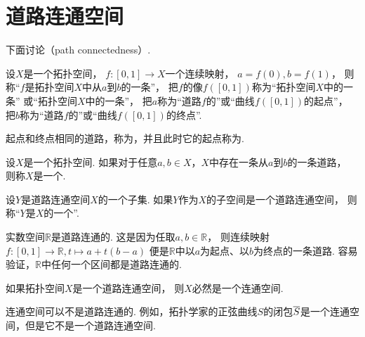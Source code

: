 \section{道路连通空间}
下面讨论（path connectedness）.

\begin{definition}
设\(X\)是一个拓扑空间，
\(f\colon [0,1] \to X\)一个连续映射，
\(a=f(0),
b=f(1)\)，
则称“\(f\)是拓扑空间\(X\)中从\(a\)到\(b\)的一条”，
把\(f\)的像\(f([0,1])\)称为“拓扑空间\(X\)中的一条”
或“拓扑空间\(X\)中的一条”，
把\(a\)称为“道路\(f\)的”或“曲线\(f([0,1])\)的{起点}”，
把\(b\)称为“道路\(f\)的”或“曲线\(f([0,1])\)的{终点}”.
\end{definition}

\begin{definition}
起点和终点相同的道路，称为，并且此时它的起点称为.
\end{definition}

\begin{definition}
设\(X\)是一个拓扑空间.
如果对于任意\(a,b \in X\)，\(X\)中存在一条从\(a\)到\(b\)的一条道路，
则称\(X\)是一个.
\end{definition}

\begin{definition}
设\(Y\)是道路连通空间\(X\)的一个子集.
如果\(Y\)作为\(X\)的子空间是一个道路连通空间，
则称“\(Y\)是\(X\)的一个”.
\end{definition}

实数空间\(\mathbb{R}\)是道路连通的.
这是因为任取\(a,b \in \mathbb{R}\)，
则连续映射\(f\colon [0,1] \to \mathbb{R}, t \mapsto a+t(b-a)\)
便是\(\mathbb{R}\)中以\(a\)为起点、以\(b\)为终点的一条道路.
容易验证，\(\mathbb{R}\)中任何一个区间都是道路连通的.

\begin{theorem}\label{theorem:道路连通空间.道路连通空间一定是连通空间}
如果拓扑空间\(X\)是一个道路连通空间，
则\(X\)必然是一个连通空间.
\end{theorem}

连通空间可以不是道路连通的.
例如，拓扑学家的正弦曲线\(S\)的闭包\(\overline{S}\)是一个连通空间，但是它不是一个道路连通空间.

